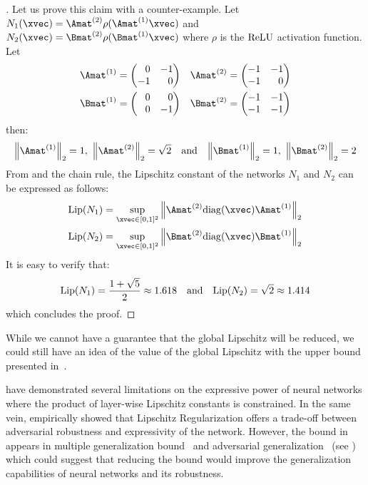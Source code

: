 \begin{proof}[]
  Let us prove this claim with a counter-example.
  Let $N_1(\xvec) = \Amat^{(2)} \rho(\Amat^{(1)} \xvec)$ and $N_2(\xvec) = \Bmat^{(2)} \rho(\Bmat^{(1)} \xvec)$ where $\rho$ is the $\mathrm{ReLU}$ activation function.
  Let
  \begin{align*}
    \Amat^{(1)} &= \leftmatrix 
      \phantom{+}0 & -1 \\ -1 & \phantom{+}0
    \rightmatrix \quad
    \Amat^{(2)}  = \leftmatrix
      -1 & -1 \\ -1 & \phantom{+}0
    \rightmatrix \\
    \Bmat^{(1)} &= \leftmatrix
      \phantom{+}0 & \phantom{+}0 \\ \phantom{+}0 & -1
    \rightmatrix \quad
    \Bmat^{(2)} = \leftmatrix
      -1 & -1 \\ -1 & -1
    \rightmatrix
  \end{align*}
  then: \vspace{-0.5cm}
  \begin{equation*}
    \norm{\Amat^{(1)}}_2 = 1,\ \norm{\Amat^{(2)}}_2 = \sqrt{2}
    \quad \text{and} \quad
    \norm{\Bmat^{(1)}}_2 = 1,\ \norm{\Bmat^{(2)}}_2 = 2
  \end{equation*}
  From  and the chain rule, the Lipschitz constant of the networks $N_1$ and $N_2$ can be expressed as follows:
  \begin{align*}
    \lip{N_1} &= \sup_{\xvec \in [0, 1]^2} \norm{\Amat^{(2)} \diag\left(\xvec\right) \Amat^{(1)}}_2 \\
    \lip{N_2} &= \sup_{\xvec \in [0, 1]^2} \norm{\Bmat^{(2)} \diag\left(\xvec\right) \Bmat^{(1)}}_2
  \end{align*}
  It is easy to verify that:
  \begin{equation*}
    \lip{N_1} = \frac{1 + \sqrt{5}}{2} \approx 1.618 \quad \text{and} \quad \lip{N_2} = \sqrt{2} \approx 1.414
  \end{equation*}
  which concludes the proof.
\end{proof}
\noindent
While we cannot have a guarantee that the global Lipschitz will be reduced, we could still have an idea of the value of the global Lipschitz with the upper bound presented in~.


\citet{huster2018limitations} have demonstrated several limitations on the expressive power of neural networks where the product of layer-wise Lipschitz constants is constrained.
In the same vein, \citet{couellan2019coupling} empirically showed that Lipschitz Regularization offers a trade-off between adversarial robustness and expressivity of the network.
However, the bound in  appears in multiple generalization bound~\cite{neyshabur2017,bartlett2017spectrally,golowich2018} and adversarial generalization~\cite{farnia2018generalizable} (see ) which could suggest that reducing the bound would improve the generalization capabilities of neural networks and its robustness.

